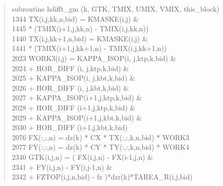 \begin{quotation}
\small
\linespread{0.5}\selectfont{} \hspace{1em} subroutine hdifft\_gm (k, GTK, TMIX, UMIX, VMIX, this\_block)\\
1344 \hspace{1em} TX(i,j,kk,n,bid) = KMASKE(i,j)  \&\\
1445 \hspace{1em} * (TMIX(i+1,j,kk,n) - TMIX(i,j,kk,n))\\
1440 \hspace{1em} TX(i,j,kk+1,n,bid) = KMASKE(i,j)  \&\\
1441 \hspace{1em} * (TMIX(i+1,j,kk+1,n) - TMIX(i,j,kk+1,n))\\
2023 \hspace{1em} WORK3(i,j) = KAPPA\_ISOP(i,  j,ktp,k,bid)  \&\\
2024 \hspace{1em} + HOR\_DIFF  (i,  j,ktp,k,bid)  \&\\
2025 \hspace{1em} + KAPPA\_ISOP(i,  j,kbt,k,bid)  \&\\
2026 \hspace{1em} + HOR\_DIFF  (i,  j,kbt,k,bid)  \&\\
2027 \hspace{1em} + KAPPA\_ISOP(i+1,j,ktp,k,bid)  \&\\
2028 \hspace{1em} + HOR\_DIFF  (i+1,j,ktp,k,bid)  \&\\
2029 \hspace{1em} + KAPPA\_ISOP(i+1,j,kbt,k,bid)  \&\\
2030 \hspace{1em} + HOR\_DIFF  (i+1,j,kbt,k,bid)\\
2076 \hspace{1em} FX(:,:,n) = dz(k) * CX * TX(:,:,k,n,bid) * WORK3\\
2077 \hspace{1em} FY(:,:,n) = dz(k) * CY * TY(:,:,k,n,bid) * WORK4 \\
2340 \hspace{1em} GTK(i,j,n) = ( FX(i,j,n) - FX(i-1,j,n)  \&\\
2341 \hspace{1em}  + FY(i,j,n) - FY(i,j-1,n)  \&\\
2342 \hspace{1em}  + FZTOP(i,j,n,bid) - fz )*dzr(k)*TAREA\_R(i,j,bid)
\end{quotation}
